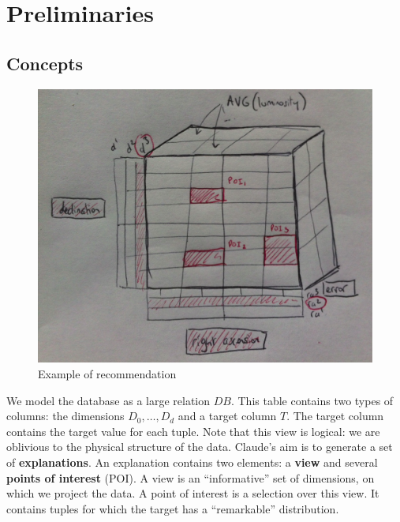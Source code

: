 \section{Preliminaries}

\subsection{Concepts}
\begin{figure}[t!]
\centering
\includegraphics[width=0.9\columnwidth]{images/cube}
\caption{Example of recommendation}
\label{cube}
\end{figure}
We model the database as a large relation $DB$. This table contains two types
of columns: the dimensions $D_0, \ldots, D_d$ and a target column $T$. The
target column contains the target value for each tuple. Note that this view is
logical: we are oblivious to the physical structure of the data.  Claude's aim
is to generate a set of \textbf{explanations}.  An explanation contains two
elements: a \textbf{view} and several \textbf{points of interest} (POI). A view
is an ``informative'' set of dimensions, on which we project the data.  A point of
interest is a selection over this view. It contains tuples for which the target
has a ``remarkable'' distribution.

